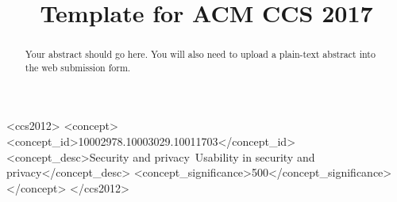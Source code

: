 \documentclass[sigconf, anonymous]{acmart}
\begin{document}
\title{Template for ACM CCS 2017} %

\begin{abstract}
Your abstract should go here. You will also need to upload a plain-text abstract into the web submission form.
\end{abstract}

\begin{CCSXML}
<ccs2012>
<concept>
<concept_id>10002978.10003029.10011703</concept_id>
<concept_desc>Security and privacy~Usability in security and privacy</concept_desc>
<concept_significance>500</concept_significance>
</concept>
</ccs2012>
\end{CCSXML}



\maketitle




\end{document}
